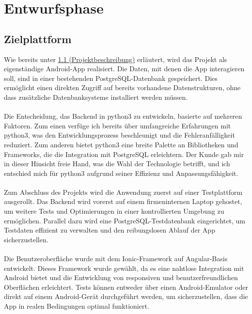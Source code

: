 \documentclass[a4paper,12pt]{article}
\begin{document}
\section{Entwurfsphase}
\subsection{Zielplattform}
Wie bereits unter \hyperref[sec:projektbeschreibung]{1.1 (Projektbeschreibung)} erläutert, wird das Projekt als eigenständige Android-App realisiert. Die Daten, mit denen die App interagieren soll, sind in einer bestehenden PostgreSQL-Datenbank gespeichert. Dies ermöglicht einen direkten Zugriff auf bereits vorhandene Datenstrukturen, ohne dass zusätzliche Datenbanksysteme installiert werden müssen.\\
\\
Die Entscheidung, das Backend in \acrshort{python3} zu entwickeln, basierte auf mehreren Faktoren. Zum einen verfüge ich bereits über umfangreiche Erfahrungen mit \acrshort{python3}, was den Entwicklungsprozess beschleunigt und die Fehleranfälligkeit reduziert. Zum anderen bietet \acrshort{python3} eine breite Palette an Bibliotheken und Frameworks, die die Integration mit PostgreSQL erleichtern. Der Kunde gab mir in dieser Hinsicht freie Hand, was die Wahl der Technologie betrifft, und ich entschied mich für \acrshort{python3} aufgrund seiner Effizienz und Anpassungsfähigkeit.\\
\\
Zum Abschluss des Projekts wird die Anwendung zuerst auf einer Testplattform ausgerollt. Das Backend wird vorerst auf einem firmeninternen Laptop gehostet, um weitere Tests und Optimierungen in einer kontrollierten Umgebung zu ermöglichen. Parallel dazu wird eine PostgreSQL-Testdatenbank eingerichtet, um Testdaten effizient zu verwalten und den reibungslosen Ablauf der App sicherzustellen.\\
\\
Die Benutzeroberfläche wurde mit dem Ionic-Framework auf Angular-Basis entwickelt. Dieses Framework wurde gewählt, da es eine nahtlose Integration mit Android bietet und die Entwicklung von responsiven und benutzerfreundlichen Oberflächen erleichtert. Tests können entweder über einen Android-Emulator oder direkt auf einem Android-Gerät durchgeführt werden, um sicherzustellen, dass die App in realen Bedingungen optimal funktioniert.
\end{document}
